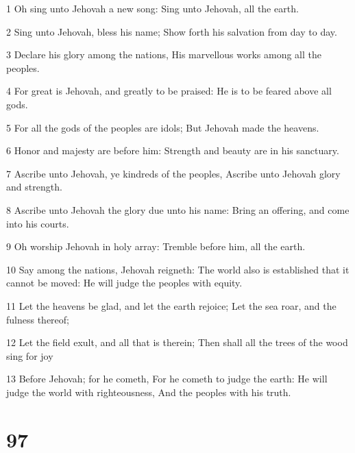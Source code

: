 \par 1 Oh sing unto Jehovah a new song: Sing unto Jehovah, all the earth.
\par 2 Sing unto Jehovah, bless his name; Show forth his salvation from day to day.
\par 3 Declare his glory among the nations, His marvellous works among all the peoples.
\par 4 For great is Jehovah, and greatly to be praised: He is to be feared above all gods.
\par 5 For all the gods of the peoples are idols; But Jehovah made the heavens.
\par 6 Honor and majesty are before him: Strength and beauty are in his sanctuary.
\par 7 Ascribe unto Jehovah, ye kindreds of the peoples, Ascribe unto Jehovah glory and strength.
\par 8 Ascribe unto Jehovah the glory due unto his name: Bring an offering, and come into his courts.
\par 9 Oh worship Jehovah in holy array: Tremble before him, all the earth.
\par 10 Say among the nations, Jehovah reigneth: The world also is established that it cannot be moved: He will judge the peoples with equity.
\par 11 Let the heavens be glad, and let the earth rejoice; Let the sea roar, and the fulness thereof;
\par 12 Let the field exult, and all that is therein; Then shall all the trees of the wood sing for joy
\par 13 Before Jehovah; for he cometh, For he cometh to judge the earth: He will judge the world with righteousness, And the peoples with his truth.

\chapter{97}

